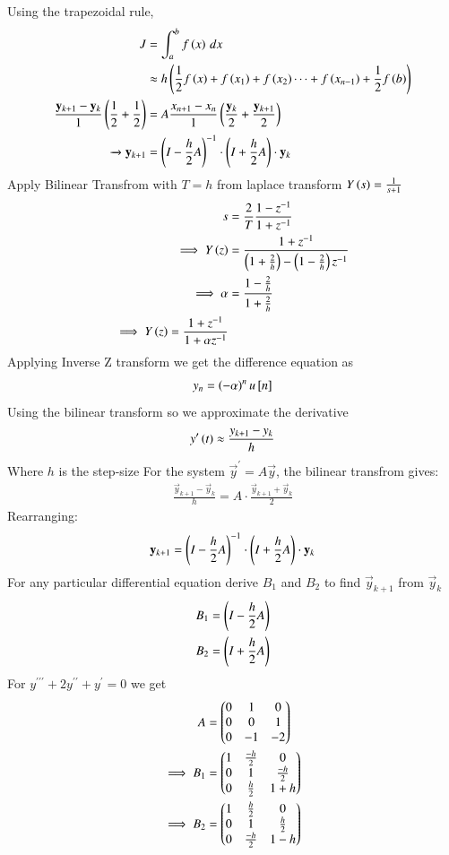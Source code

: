 \documentclass[journal]{IEEEtran}
\begin{document}
Using the trapezoidal rule,
\begin{align}
    J &= \int_a^b f\left(x\right)\, dx\\
    &\approx h\left(\frac{1}{2}f\left(x\right) + f\left(x_1\right) + f\left(x_2\right) \cdots + f\left(x_{n-1}\right) + \frac{1}{2}f\left(b\right)\right)\\
    \frac{\mathbf{y}_{k+1} - \mathbf{y}_k}{1}\left(\frac{1}{2} + \frac{1}{2}\right)
    &= A\frac{x_{n+1} - x_{n}}{1}\left(\frac{\mathbf{y}_k}{2} +\frac{\mathbf{y}_{k+1}}{2}\right) \\ 
    \xrightarrow{} \mathbf{y}_{k+1}&=\left(I-\frac{h}{2}A\right)^{-1}\cdot\left(I+\frac{h}{2}A\right)\cdot\mathbf{y}_k
\end{align}
Apply Bilinear Transfrom with $T=h$ from laplace transform $Y\left(s\right)=\frac{1}{s+1}$
\begin{align}
    s&=\frac{2}{T}\frac{1-z^{-1}}{1+z^{-1}}\\
    \implies Y\left(z\right)&=\frac{1+z^{-1}}{\left(1+\frac{2}{h}\right)-\left(1-\frac{2}{h}\right)z^{-1}}\\
    \implies \alpha&=\frac{1-\frac{2}{h}}{1+\frac{2}{h}}\\
    \implies Y\left(z\right)=\frac{1+z^{-1}}{1+\alpha z^{-1}}
\end{align}
Applying Inverse Z transform we get the difference equation as 
\begin{align}
    y_n=\left(-\alpha\right)^n u{}\left[n\right]
\end{align}
Using the bilinear transform so we approximate the derivative
\begin{align}
	y^{\prime}\left(t\right)\approx\frac{y_{k+1}-y_k}{h}\\
\end{align}
Where $h$ is the step-size For the system $\vec{y}^\prime=A\vec{y}$, the bilinear transfrom gives:
\begin{align}
    \frac{\vec{y}_{k+1}-\vec{y}_k}{h}=A\cdot\frac{\vec{y}_{k+1}+\vec{y}_{k}}{2}
\end{align}
Rearranging:
\begin{align}
    \mathbf{y}_{k+1}=\left(I-\frac{h}{2}A\right)^{-1}\cdot\left(I+\frac{h}{2}A\right)\cdot\mathbf{y}_k
\end{align}
For any particular differential equation derive $B_1$ and $B_2$ to find $\vec{y}_{k+1}$ from $\vec{y}_k$
\begin{align}
    B_1=\left(I-\frac{h}{2}A\right)\\
    B_2=\left(I+\frac{h}{2}A\right)
\end{align}
For $y^{\prime\prime\prime}+2y^{\prime\prime}+y^{\prime} = 0$ we get
\begin{align}
    A&=\begin{pmatrix}0&1&0\\0&0&1\\0&-1&-2\end{pmatrix}\\
    \implies B_1&=\begin{pmatrix}1&\frac{-h}{2}&0\\0&1&\frac{-h}{2}\\0&\frac{h}{2}&1+h\end{pmatrix}\\
    \implies B_2&=\begin{pmatrix}1&\frac{h}{2}&0\\0&1&\frac{h}{2}\\0&\frac{-h}{2}&1-h\end{pmatrix}\\
\end{align}
\end{document}
